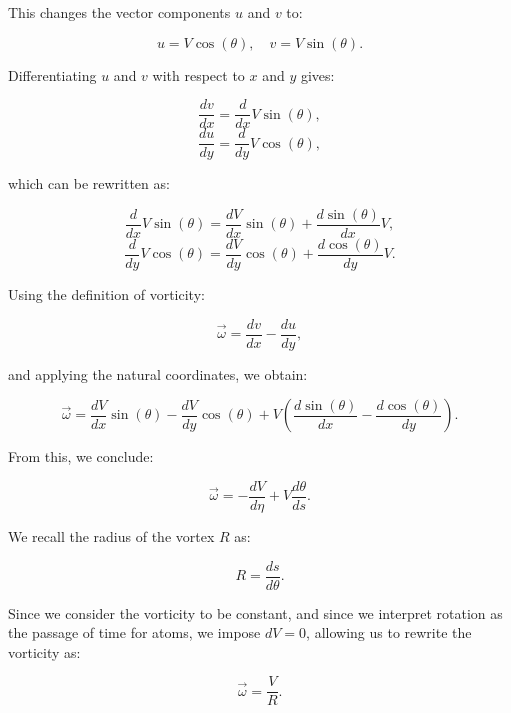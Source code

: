 \documentclass[12pt]{article}
\begin{document}
This changes the vector components $u$ and $v$ to:


\begin{equation*}
u=V \cos (\theta), \quad v=V \sin (\theta).
\end{equation*}


Differentiating $u$ and $v$ with respect to $x$ and $y$ gives:


\begin{equation*}
\frac{d v}{d x}=\frac{d}{d x} V \sin (\theta),
\end{equation*}
\begin{equation*}
\frac{d u}{d y}=\frac{d}{d y} V \cos (\theta),
\end{equation*}


which can be rewritten as:


\begin{equation*}
\frac{d}{d x} V \sin (\theta) = \frac{d V}{d x} \sin (\theta) + \frac{d \sin (\theta)}{d x} V,
\end{equation*}
\begin{equation*}
\frac{d}{d y} V \cos (\theta) = \frac{d V}{d y} \cos (\theta) + \frac{d \cos (\theta)}{d y} V.
\end{equation*}


Using the definition of vorticity:


\begin{equation*}
\vec{\omega} = \frac{d v}{d x} - \frac{d u}{d y},
\end{equation*}


and applying the natural coordinates, we obtain:


\begin{equation*}
\vec{\omega} = \frac{d V}{d x} \sin (\theta) - \frac{d V}{d y} \cos (\theta) + V\left(\frac{d \sin (\theta)}{d x} - \frac{d \cos (\theta)}{d y}\right).
\end{equation*}


From this, we conclude:


\begin{equation*}
\vec{\omega} = -\frac{d V}{d \eta} + V \frac{d \theta}{d s}.
\end{equation*}


We recall the radius of the vortex $R$ as:


\begin{equation*}
R = \frac{d s}{d \theta}.
\end{equation*}


Since we consider the vorticity to be constant, and since we interpret rotation as the passage of time for atoms, we impose $dV=0$, allowing us to rewrite the vorticity as:


\begin{equation*}
\vec{\omega} = \frac{V}{R}.
\end{equation*}

\ifdefined\standalonechapter
\else


\end{document}
